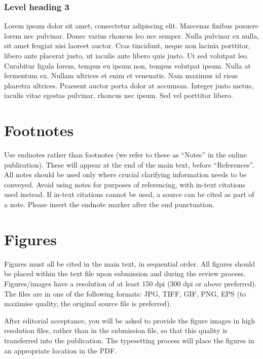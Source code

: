 \documentclass{article}
\begin{document}
\subsubsection{Level heading 3}

Lorem ipsum dolor sit amet, consectetur adipiscing elit.
Maecenas finibus posuere lorem nec pulvinar. Donec varius rhoncus leo
nec semper. Nulla pulvinar ex nulla, sit amet feugiat nisi laoreet auctor.
Cras tincidunt, neque non lacinia porttitor, libero ante placerat justo,
ut iaculis ante libero quis justo. Ut sed volutpat leo. Curabitur ligula
lorem, tempus eu ipsum non, tempus volutpat ipsum. Nulla at fermentum ex.
Nullam ultrices et enim et venenatis. Nam maximus id risus pharetra ultrices.
Praesent auctor porta dolor at accumsan.
Integer justo metus, iaculis vitae egestas pulvinar, rhoncus nec ipsum.
Sed vel porttitor libero.

\section{Footnotes}\label{sec:footnotes}

Use endnotes rather than footnotes
(we refer to these as ``Notes'' in the online publication).
These will appear at the end of the main text, before ``References''.
All notes should be used only where crucial clarifying information
needs to be conveyed.
Avoid using notes for purposes of referencing, with in-text citations used
instead.
If in-text citations cannot be used, a source can be cited as part of a note.
Please insert the endnote marker after the end punctuation.

\section{Figures}\label{sec:figures}

Figures must all be cited in the main text, in sequential order.
All figures should be placed within the text file upon submission and during
the review process. Figures/images have a resolution of at least 150 dpi
(300 dpi or above preferred). The files are in one of the following formats:
JPG, TIFF, GIF, PNG, EPS (to maximise quality,
the original source file is preferred).

After editorial acceptance, you will be asked to provide the figure
images in high resolution files, rather than in the submission file,
so that this quality is transferred into the publication.
The typesetting process will place the figures in an appropriate
location in the PDF.
\end{document}
